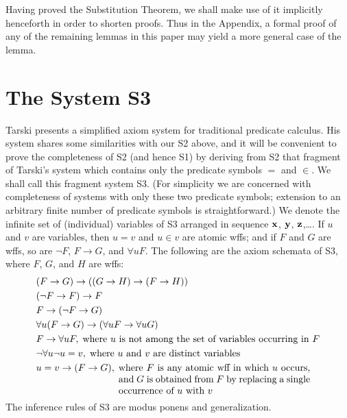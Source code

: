 \documentclass[leqno]{article}
\begin{document}
     Having proved the Substitution Theorem, we shall make use of it
implicitly henceforth in order to shorten proofs.  Thus in the Appendix, a
formal proof of any of the remaining lemmas in this paper may yield a more
general case of the lemma.


\section{The System S3}

     Tarski \cite{Tarski} presents a simplified axiom system for traditional
predicate calculus.  His system shares some similarities with our S2 above,
and it will be convenient to prove the completeness of S2 (and hence S1) by
deriving from S2 that fragment of Tarski's system which contains only the
predicate symbols $=$ and $\in $.  We shall call this fragment system S3.
(For simplicity we are concerned with completeness of systems with only these
two predicate symbols;  extension to an arbitrary finite number of predicate
symbols is straightforward.)  We denote the infinite set of (individual)
variables of S3 arranged in sequence ${\bf x}$, ${\bf y}$, ${\bf z}$,\ldots .
If $u$ and $v$ are variables, then $u=v$ and $u\in v$ are atomic wffs; and if
$F$ and $G$ are wffs, so are $\lnot F$, $F\rightarrow G$, and $\forall uF$.
The following are the axiom schemata of S3, where $F$, $G$, and $H$ are wffs:
\setcounter{equation}{0} \renewcommand{\theequation}{C\arabic{equation}}
\begin{eqnarray} %
  & (F\rightarrow G)\rightarrow ((G\rightarrow H)\rightarrow (F\rightarrow
     H)) \\
  & (\lnot F\rightarrow F)\rightarrow F \\
  & F\rightarrow (\lnot F\rightarrow G) \\
  & \forall u(F\rightarrow G)\rightarrow (\forall uF\rightarrow \forall
     uG) \\
  & F\rightarrow \forall uF, \;
        \mbox{where $u$ is not among the set of variables
              occurring in $F$}  \\
  & \lnot \forall u\lnot u=v, \;
           \mbox{where $u$ and $v$ are distinct
           variables} \\
  & u=v\rightarrow (F\rightarrow G), \;
         \parbox[t]{20em}{where $F$ is any atomic wff in which
             $u$ occurs, and $G$ is obtained from $F$ by
               replacing a single occurrence of $u$
		            with $v$}
\end{eqnarray}
The inference rules of S3 are modus ponens and generalization.
\end{document}
